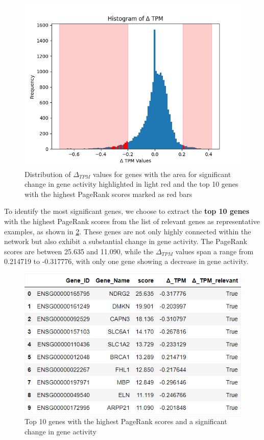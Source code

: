 \begin{figure}[!h]
    \centering
    \includegraphics[height=\dfheightdouble]{figures/04_delta_tpm_relevant}
    \caption{Distribution of $\Delta_{TPM}$ values for genes with the area for significant change in gene activity highlighted in light red
    and the top 10 genes with the highest PageRank scores marked as red bars}
    \label{fig:04_delta_tpm_relevant}
\end{figure}


To identify the most significant genes, we choose to extract the \textbf{top 10 genes} with the highest PageRank scores from the list of relevant genes
as representative examples, as shown in \cref{fig:03_03_df_pagerank_relevant}.
These genes are not only highly connected within the network but also exhibit a substantial change in gene activity.
The PageRank scores are between 25.635 and 11.090,
while the $\Delta_{TPM}$ values span a range from 0.214719 to -0.317776, with only one gene showing a decrease in gene activity.\\


\begin{figure}[!h]
    \centering
    \includegraphics[height=\dfheightdouble]{figures/03_03_df_pagerank_relevant}
    \caption{Top 10 genes with the highest PageRank scores and a significant change in gene activity}
    \label{fig:03_03_df_pagerank_relevant}
\end{figure}

